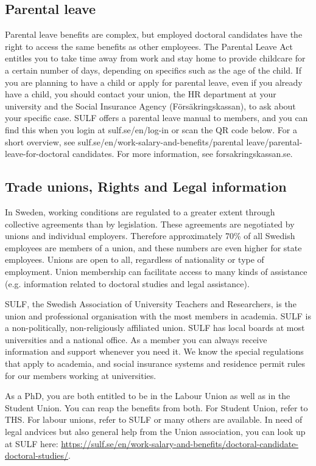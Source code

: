 \documentclass{article}
\begin{document}
\subsection{Parental leave}
Parental leave benefits are complex, but employed doctoral candidates have the right to access the same benefits as other employees. The Parental Leave Act entitles you to take time away from
work and stay home to provide childcare for a certain number of days, depending on specifics such as the age of the child. If you are planning to have a child or apply for parental leave, even if you
already have a child, you should contact your union, the HR department at your university and the Social Insurance Agency (Försäkringskassan), to ask about your specific case. SULF offers
a parental leave manual to members, and you can find this when you login at sulf.se/en/log-in or scan the QR code below. For a short overview, see sulf.se/en/work-salary-and-benefits/parental
leave/parental-leave-for-doctoral candidates. For more information, see  forsakringskassan.se.

\subsection{Trade unions, Rights and Legal information}
In Sweden, working conditions are regulated to a greater extent through collective agreements than by legislation. These agreements are negotiated by unions and individual employers. Therefore approximately 70\% of all Swedish employees are members of a union, and these numbers are even higher for state employees. Unions are open to all, regardless of nationality or type
of employment. Union membership can facilitate access to many kinds of assistance (e.g. information related to doctoral studies and legal assistance).

SULF, the Swedish Association of University Teachers and Researchers, is the union and professional organisation with the most members in academia. SULF is a non-politically, non-religiously affiliated union. SULF has local boards at most universities and a national office. As a member you can always receive information and support whenever you need it. We know the special regulations that apply to academia, and social insurance systems and residence permit rules for our members working at universities.

As a PhD, you are both entitled to be in the Labour Union as well as in the Student Union. You can reap the benefits from both. For Student Union, refer to THS. For labour unions, refer to SULF or many others are available. In need of legal andvices but also general help from the Union association, you can look up at SULF here: \url{https://sulf.se/en/work-salary-and-benefits/doctoral-candidate-doctoral-studies/}.
\end{document}
